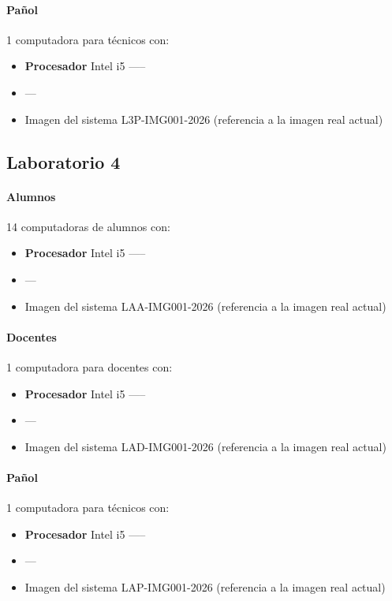 {\paragraph{Pañol} 1 computadora para técnicos con:
\begin{itemize}
    \item \textbf{Procesador} Intel i5 -----
    \item ---
    \item Imagen del sistema L3P-IMG001-2026 (referencia a la imagen real actual)
\end{itemize}

\subsection{Laboratorio 4}

\paragraph{Alumnos} 14 computadoras de alumnos con:
\begin{itemize}
    \item \textbf{Procesador} Intel i5 -----
    \item ---
    \item Imagen del sistema LAA-IMG001-2026 (referencia a la imagen real actual)
\end{itemize}

\paragraph{Docentes} 1 computadora para docentes con:
\begin{itemize}
    \item \textbf{Procesador} Intel i5 -----
    \item ---
    \item Imagen del sistema LAD-IMG001-2026 (referencia a la imagen real actual)
\end{itemize}

\paragraph{Pañol} 1 computadora para técnicos con:
\begin{itemize}
    \item \textbf{Procesador} Intel i5 -----
    \item ---
    \item Imagen del sistema LAP-IMG001-2026 (referencia a la imagen real actual)
\end{itemize}

}
